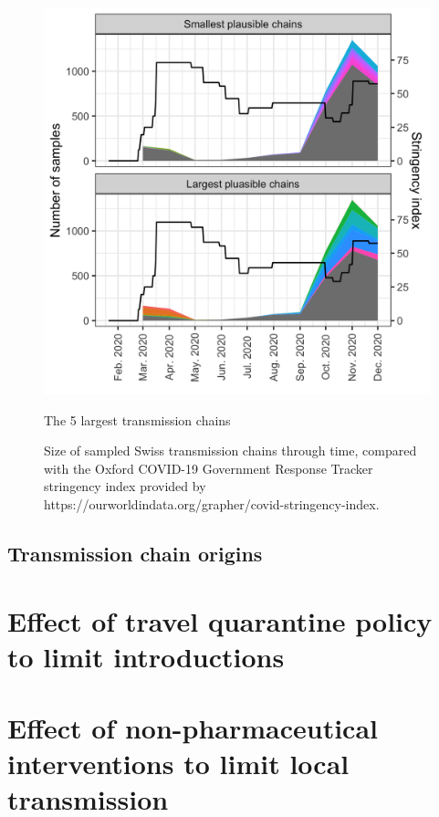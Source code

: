 \documentclass[9pt,twocolumn,twoside,lineno]{pnas-new}
\begin{document}
\begin{figure}[tbhp]
\centering
\includegraphics[width=.8\linewidth]{figures/fig_1_chains_through_time.png}
\caption{Size of sampled Swiss transmission chains through time, compared with the Oxford COVID-19 Government Response Tracker stringency index provided by https://ourworldindata.org/grapher/covid-stringency-index.} The 5 largest transmission chains 
\label{fig:chain-description-v2}
\end{figure}

\subsection{Transmission chain origins}


\section*{Effect of travel quarantine policy to limit introductions}



\section*{Effect of non-pharmaceutical interventions to limit local transmission}


\end{document}
